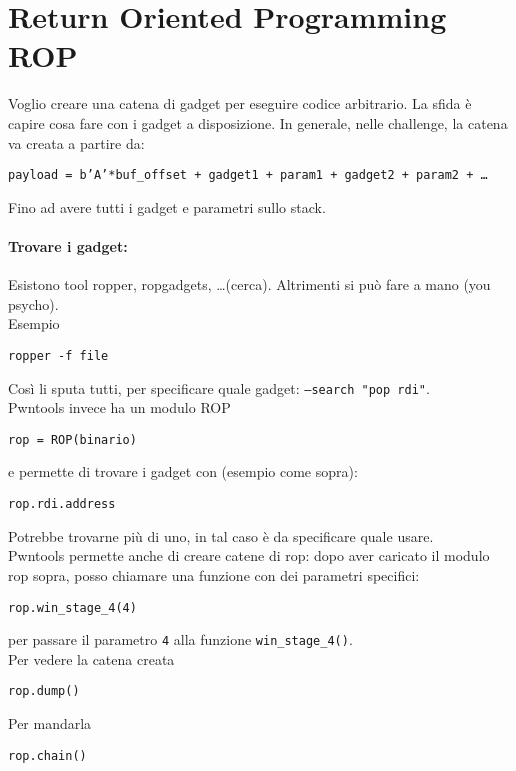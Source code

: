 \section{Return Oriented Programming ROP}

Voglio creare una catena di gadget per eseguire codice arbitrario. La sfida è capire cosa fare con i gadget a disposizione. In generale, nelle challenge, la catena va creata a partire da: 
\begin{center}
	\texttt{payload = b'A'*buf\_offset + gadget1 + param1 + gadget2 + param2 + \dots}
\end{center}
Fino ad avere tutti i gadget e parametri sullo stack.\\

\paragraph{Trovare i gadget:} Esistono tool ropper, ropgadgets, \dots (cerca). Altrimenti si può fare a mano (you psycho).\\
Esempio 
\begin{center}
	\texttt{ropper -f file}
\end{center}
Così li sputa tutti, per specificare quale gadget: \texttt{--search "pop rdi"}.\\

Pwntools invece ha un modulo ROP
\begin{center}
	\texttt{rop = ROP(binario)}
\end{center}
e permette di trovare i gadget con (esempio come sopra):
\begin{center}
	\texttt{rop.rdi.address}
\end{center}
Potrebbe trovarne più di uno, in tal caso è da specificare quale usare.\\

Pwntools permette anche di creare catene di rop: dopo aver caricato il modulo rop sopra, posso chiamare una funzione con dei parametri specifici:
\begin{center}
	\texttt{rop.win\_stage\_4(4)}
\end{center}
per passare il parametro \texttt{4} alla funzione \texttt{win\_stage\_4()}.\\

Per vedere la catena creata
\begin{center}
	\texttt{rop.dump()}
\end{center}
Per mandarla 
\begin{center}
	\texttt{rop.chain()}
\end{center}

